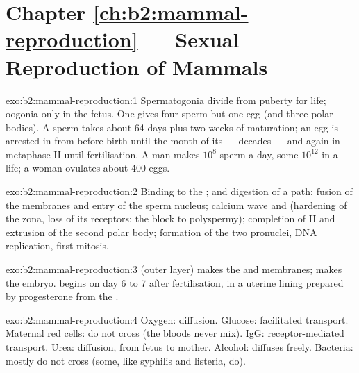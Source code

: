 \section*{Chapter \ref{ch:b2:mammal-reproduction} --- Sexual Reproduction of Mammals}

\begin{solution}{exo:b2:mammal-reproduction:1}
Spermatogonia divide from puberty for life; oogonia only in the
fetus. One  gives four sperm but one egg (and three polar
bodies). A sperm takes about 64 days plus two weeks of maturation;
an egg is arrested in  from before birth until the month
of its  --- decades --- and again in metaphase II until
fertilisation. A man makes $10^{8}$ sperm a day, some $10^{12}$ in a
life; a woman ovulates about 400 eggs.
\end{solution}

\begin{solution}{exo:b2:mammal-reproduction:2}
Binding to the ;  and digestion of a
path; fusion of the membranes and entry of the sperm nucleus;
calcium wave and  (hardening of the zona, loss of
its receptors: the block to polyspermy); completion of  II
and extrusion of the second polar body; formation of the two
pronuclei, DNA replication, first mitosis.
\end{solution}

\begin{solution}{exo:b2:mammal-reproduction:3}
 (outer layer) makes the  and membranes;  makes the embryo.  begins on day 6 to 7
after fertilisation, in a uterine lining prepared by progesterone
from the .
\end{solution}

\begin{solution}{exo:b2:mammal-reproduction:4}
Oxygen: diffusion. Glucose: facilitated transport. Maternal red
cells: do not cross (the bloods never mix). IgG: receptor-mediated
transport. Urea: diffusion, from fetus to mother. Alcohol: diffuses
freely. Bacteria: mostly do not cross (some, like syphilis and
listeria, do).
\end{solution}

